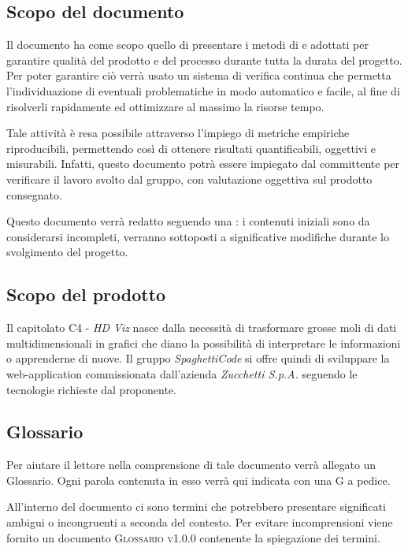 \documentclass[../piano_di_qualifica.tex]{subfiles}
\begin{document}
\subsection{Scopo del documento}
Il documento ha come scopo quello di presentare i metodi di  e  adottati per garantire qualità del prodotto e del processo durante tutta la durata del progetto. Per poter garantire ciò verrà usato un sistema di verifica continua che permetta l'individuazione di eventuali problematiche in modo automatico e facile, al fine di risolverli rapidamente ed ottimizzare al massimo la risorse tempo.

Tale attività è resa possibile attraverso l’impiego di metriche empiriche riproducibili, permettendo così di ottenere risultati quantificabili, oggettivi e misurabili. Infatti, questo documento potrà essere impiegato dal committente per verificare il lavoro svolto dal gruppo, con valutazione oggettiva sul prodotto consegnato.

Questo documento verrà redatto seguendo una : i contenuti iniziali sono da considerarsi incompleti, verranno sottoposti a significative modifiche  durante lo svolgimento del progetto.

\subsection{Scopo del prodotto}
Il capitolato C4 - \emph{HD Viz} nasce dalla necessità di trasformare grosse moli di dati multidimensionali in grafici che diano la possibilità di interpretare le informazioni o apprenderne di nuove. Il gruppo \emph{SpaghettiCode} si offre quindi di sviluppare la web-application commissionata dall’azienda \emph{Zucchetti S.p.A.} seguendo le tecnologie richieste dal proponente.

\subsection{Glossario}
Per aiutare il lettore nella comprensione di tale documento verrà allegato un Glossario. Ogni parola contenuta in esso verrà qui indicata con una G a pedice.

All'interno del documento ci sono termini che potrebbero presentare significati ambigui o incongruenti a seconda del contesto. Per evitare incomprensioni viene fornito un documento \textsc{Glossario v1.0.0} contenente la spiegazione dei termini.
\end{document}
